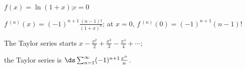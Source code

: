{$f(x) = \ln(1+x)$;\quad $c=0$
}
{$f\,^{(n)}(x) = (-1)^{n+1}\frac{(n-1)!}{(1+x)^n}$; at $x=0$, $f\,^{(n)}(0)=(-1)^{n+1}(n-1)!$

The Taylor series starts $x-\frac{x^2}2+\frac{x^3}3-\frac{x^4}4+\cdots$; 

the Taylor series is $\ds \sum_{n=1}^\infty (-1)^{n+1}\frac{x^n}{n}$.
}